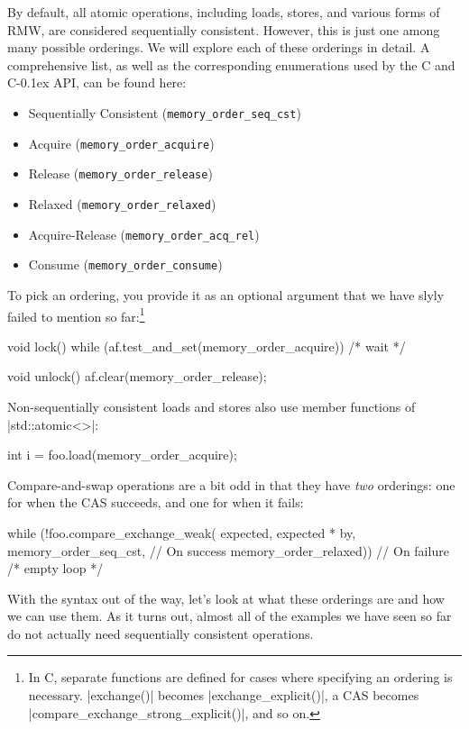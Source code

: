 \documentclass[fontsize=10pt, oneside]{scrartcl}
\newcommand{\monobox}[1]{\mbox{\texttt{#1}}}
\newcommand{\cplusplus}[1]{C\kern-0.1ex\raisebox{0.15ex}{\texttt{++}}}
\newcommand{\clang}[1]{C}
\begin{document}
By default, all atomic operations, including loads, stores, and various forms of \textsc{RMW},
are considered sequentially consistent.
However, this is just one among many possible orderings.
We will explore each of these orderings in detail.
A comprehensive list, as well as the corresponding enumerations used by the \clang{} and \cplusplus{} \textsc{API}, can be found here:
\begin{itemize}
\item Sequentially Consistent (\monobox{memory\_order\_seq\_cst})
\item Acquire (\monobox{memory\_order\_acquire})
\item Release (\monobox{memory\_order\_release})
\item Relaxed (\monobox{memory\_order\_relaxed})
\item Acquire-Release (\monobox{memory\_order\_acq\_rel})
\item Consume (\monobox{memory\_order\_consume})
\end{itemize}
To pick an ordering,
you provide it as an optional argument that we have slyly failed to mention so far:\footnote{%
In \clang{}, separate functions are defined for cases where specifying an ordering is necessary.
\cc|exchange()| becomes \cc|exchange_explicit()|, a \textsc{CAS}
becomes \cc|compare_exchange_strong_explicit()|, and so on.}
\begin{cppcode}
void lock()
{
    while (af.test_and_set(memory_order_acquire)) { /* wait */ }
}

void unlock()
{
    af.clear(memory_order_release);
}
\end{cppcode}
Non-sequentially consistent loads and stores also use member functions of \cpp|std::atomic<>|:
\begin{cppcode}
int i = foo.load(memory_order_acquire);
\end{cppcode}
Compare-and-swap operations are a bit odd in that they have \emph{two} orderings: one for when the \textsc{CAS} succeeds, and one for when it fails:
\begin{cppcode}
while (!foo.compare_exchange_weak(
    expected, expected * by,
    memory_order_seq_cst, // On success
    memory_order_relaxed)) // On failure
    { /* empty loop */ }
\end{cppcode}

With the syntax out of the way,
let's look at what these orderings are and how we can use them.
As it turns out, almost all of the examples we have seen so far do not actually need sequentially consistent operations.
\end{document}
